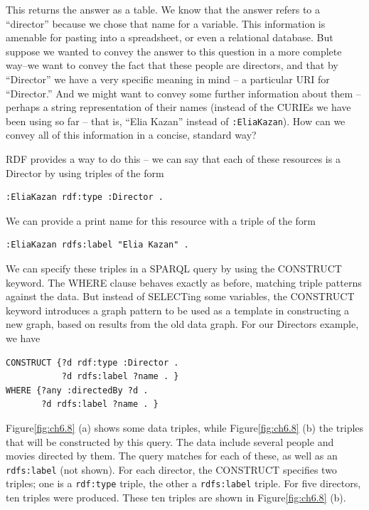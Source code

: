 This returns the answer as a table. We know that the answer refers to a
``director'' because we chose that name for a variable. This information
is amenable for pasting into a spreadsheet, or even a relational
database. But suppose we wanted to convey the answer to this question in
a more complete way--we want to convey the fact that these people are
directors, and that by ``Director'' we have a very specific meaning in
mind -- a particular URI for ``Director.'' And we might want to convey
some further information about them -- perhaps a string representation
of their names (instead of the CURIEs we have been using so far -- that
is, ``Elia Kazan'' instead of \texttt{:EliaKazan}). How can we convey all of this
information in a concise, standard way?

RDF provides a way to do this -- we can say that each of these resources
is a Director by using triples of the form

\begin{lstlisting}
:EliaKazan rdf:type :Director .
\end{lstlisting}

We can provide a print name for this resource with a triple of the form

\begin{lstlisting}
:EliaKazan rdfs:label "Elia Kazan" .
\end{lstlisting}

We can specify these triples in a SPARQL query by using the CONSTRUCT
keyword. The WHERE clause behaves exactly as before, matching triple
patterns against the data. But instead of SELECTing some variables, the
CONSTRUCT keyword introduces a graph pattern to be used as a template in
constructing a new graph, based on results from the old data graph. For
our Directors example, we have

\begin{lstlisting}
CONSTRUCT {?d rdf:type :Director .
           ?d rdfs:label ?name . }
WHERE {?any :directedBy ?d .
       ?d rdfs:label ?name . }
\end{lstlisting}

Figure\ref{fig:ch6.8} (a) shows some data triples, while Figure\ref{fig:ch6.8} (b) the triples
that will be constructed by this query. The data include several people
and movies directed by them. The query matches for each of these, as
well as an \texttt{rdfs:label} (not shown). For each director, the CONSTRUCT
specifies two triples; one is a \texttt{rdf:type} triple, the other a \texttt{rdfs:label}
triple. For five directors, ten triples were produced. These ten triples
are shown in Figure\ref{fig:ch6.8} (b).

